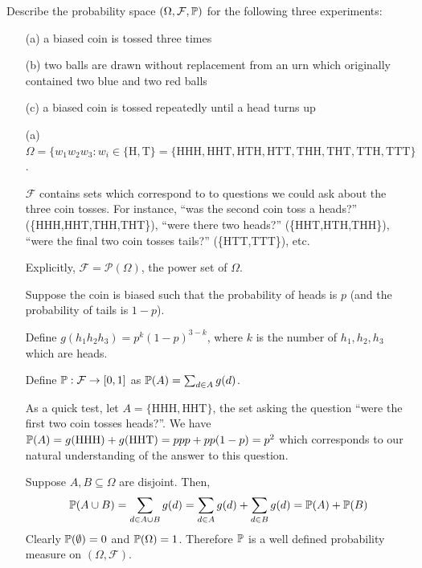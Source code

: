 \documentclass[10pt]{article}
\begin{document}
\begin{problem}[Exercise 1.3]
    Describe the probability space \( (\Omega,\mathcal{F},\mathbb{P}) \) for the following three experiments: 
	\begin{enumerate}
		\item[(a)] a biased coin is tossed three times
		\item[(b)] two balls are drawn without replacement from an urn which originally contained two blue and two red balls
		\item[(c)] a biased coin is tossed repeatedly until a head turns up
	\end{enumerate}
\end{problem}

\begin{solution}[Solution]
\begin{enumerate}
    \item[(a)]        
        \( \Omega = \{w_1w_2w_3 : w_i\in \{\text{H},\text{T}\} = \{\text{HHH}, \text{HHT}, \text{HTH}, \text{HTT}, \text{THH}, \text{THT}, \text{TTH}, \text{TTT} \} \).

        \( \mathcal{F} \) contains sets which correspond to to questions we could ask about the three coin tosses. For instance, ``was the second coin toss a heads?'' (\{HHH,HHT,THH,THT\}), ``were there two heads?'' (\{HHT,HTH,THH\}), ``were the final two coin tosses tails?'' (\{HTT,TTT\}), etc. 
        
        Explicitly, \( \mathcal{F} = \mathcal{P}(\Omega) \), the power set of \( \Omega \).

        Suppose the coin is biased such that the probability of heads is \( p \) (and the probability of tails is \( 1-p \)).
        
        Define \( g(h_1h_2h_3) = p^k(1-p)^{3-k} \), where \( k \) is the number of \( h_1,h_2,h_3 \) which are heads.

        Define \( \mathbb{P}:\mathcal{F}\to[0,1] \) as \( \mathbb{P}(A) = \sum_{d\in A} g(d) \).

        As a quick test, let \( A=\{\text{HHH}, \text{HHT} \} \), the set asking the question ``were the first two coin tosses heads?''. We have \( \mathbb{P}(A) = g(\text{HHH}) + g(\text{HHT}) = ppp+pp(1-p) = p^2 \) which corresponds to our natural understanding of the answer to this question. 
        
        Suppose \( A,B\subseteq\Omega \) are disjoint. Then,
        \[ \mathbb{P}(A\cup B) = \sum_{d\in A\cup B}g(d) = \sum_{d\in A} g(d) + \sum_{d\in B} g(d) = \mathbb{P}(A)+\mathbb{P}(B) \] Clearly \( \mathbb{P}(\emptyset) =0 \) and \( \mathbb{P}(\Omega) = 1 \). Therefore \( \mathbb{P} \) is a well defined probability measure on \( (\Omega, \mathcal{F}) \).
        

\end{enumerate}
\end{solution}
\end{document}
